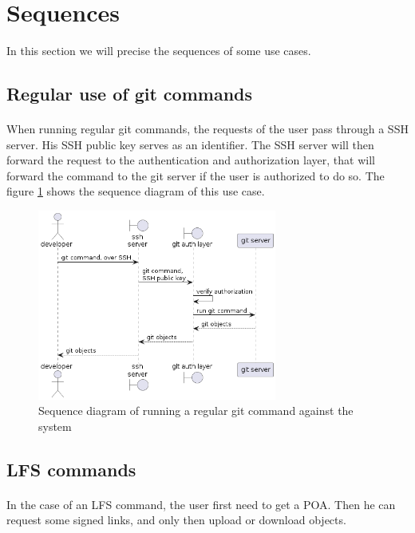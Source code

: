 \newpage
\section{Sequences}

In this section we will precise the sequences of some use cases.

\subsection{Regular use of git commands}

\paragraph{}
When running regular git commands, the requests of the user pass through a SSH server. His SSH public key serves as an identifier. The SSH server will then forward the request to the authentication and authorization layer, that will forward the command to the git server if the user is authorized to do so. The figure \ref{fig:sequence_git} shows the sequence diagram of this use case.

\begin{figure}[h]
    \centering
    \includegraphics[width=0.7\textwidth]{iteration_01/diagrams/sequence_git.png}
    \caption{Sequence diagram of running a regular git command against the system}
    \label{fig:sequence_git}
\end{figure}

\subsection{LFS commands}

\paragraph{}
In the case of an LFS command, the user first need to get a POA. Then he can request some signed links, and only then upload or download objects. 

